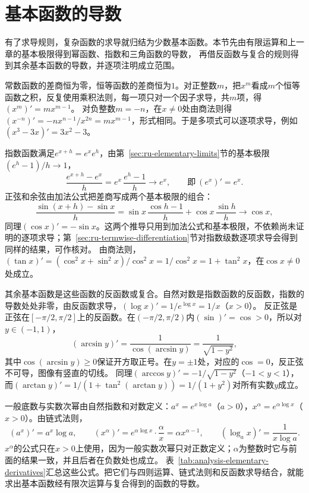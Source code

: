 \section{基本函数的导数}
\label{sec:ru-elementary-derivatives}
\label{sec:analysis-elementary-derivatives}

有了求导规则，复杂函数的求导就归结为少数基本函数。本节先由有限运算和上一章的基本极限得到幂函数、指数和三角函数的导数，
再借反函数与复合的规则得到其余基本函数的导数，并逐项注明成立范围。

常数函数的差商恒为零，恒等函数的差商恒为$1$。对正整数$m$，把$x^m$看成$m$个恒等函数之积，反复使用乘积法则，每一项只对一个因子求导，共$m$项，得$(x^m)'=mx^{m-1}$。
对负整数$m=-n$，在$x\neq0$处由商法则得$(x^{-n})'=-nx^{n-1}/x^{2n}=mx^{m-1}$，形式相同。于是多项式可以逐项求导，例如$(x^3-3x)'=3x^2-3$。

指数函数满足$e^{x+h}=e^xe^h$，由第~\ref{sec:ru-elementary-limits}节的基本极限$(e^h-1)/h\to1$，
\[
 \frac{e^{x+h}-e^x}h=e^x\,\frac{e^h-1}h\to e^x,\qquad\text{即}\ (e^x)'=e^x.
\]
正弦和余弦由加法公式把差商写成两个基本极限的组合：
\[
 \frac{\sin(x+h)-\sin x}h=\sin x\,\frac{\cos h-1}h+\cos x\,\frac{\sin h}h\to\cos x,
\]
同理$(\cos x)'=-\sin x$。这两个推导只用到加法公式和基本极限，不依赖尚未证明的逐项求导；第~\ref{sec:ru-termwise-differentiation}节对指数级数逐项求导会得到同样的结果，可作核对。
由商法则，$(\tan x)'=(\cos^2x+\sin^2x)/\cos^2x=1/\cos^2x=1+\tan^2x$，在$\cos x\neq0$处成立。

其余基本函数是这些函数的反函数或复合。自然对数是指数函数的反函数，指数的导数处处非零，由反函数求导，$(\log x)'=1/e^{\log x}=1/x$（$x>0$）。
反正弦是正弦在$[-\pi/2,\pi/2]$上的反函数。在$(-\pi/2,\pi/2)$内$(\sin)'=\cos>0$，所以对$y\in(-1,1)$，
\[
 (\arcsin y)'=\frac1{\cos(\arcsin y)}=\frac1{\sqrt{1-y^2}},
\]
其中$\cos(\arcsin y)\geq0$保证开方取正号。在$y=\pm1$处，对应的$\cos=0$，反正弦不可导，图像有竖直的切线。
同理$(\arccos y)'=-1/\sqrt{1-y^2}$（$-1<y<1$），而$(\arctan y)'=1/(1+\tan^2(\arctan y))=1/(1+y^2)$对所有实数$y$成立。

一般底数与实数次幂由自然指数和对数定义：$a^x=e^{x\log a}$（$a>0$），$x^\alpha=e^{\alpha\log x}$（$x>0$）。由链式法则，
\[
 (a^x)'=a^x\log a,\qquad (x^\alpha)'=e^{\alpha\log x}\cdot\frac\alpha x=\alpha x^{\alpha-1},\qquad (\log_ax)'=\frac1{x\log a}.
\]
$x^\alpha$的公式只在$x>0$上使用，因为一般实数次幂只对正数定义；$\alpha$为整数时它与前面的结果一致，并且后者在负数处也成立。
表~\ref{tab:analysis-elementary-derivatives}汇总这些公式。把它们与四则运算、链式法则和反函数求导结合，就能求出基本函数经有限次运算与复合得到的函数的导数。

